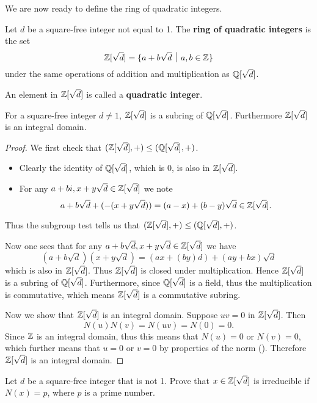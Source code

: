We are now ready to define the ring of quadratic integers.
\begin{definition}
    Let $d$ be a square-free integer not equal to 1. The \textbf{ring of quadratic integers} is the set
    \[
        \Z[\sqrt{d}] = \{a + b\sqrt{d} \vert a,b\in\Z\}
    \]
    under the same operations of addition and multiplication as $\mathbb{Q}[\sqrt{d}]$.

    An element in $\mathbb{Z}[\sqrt{d}]$ is called a \textbf{quadratic integer}.
\end{definition}
\begin{proposition}
    For a square-free integer $d \neq 1$, $\mathbb{Z}[\sqrt{d}]$ is a subring of $\mathbb{Q}[\sqrt{d}]$. Furthermore $\mathbb{Z}[\sqrt{d}]$ is an integral domain.
\end{proposition}
\begin{proof}
    We first check that $(\mathbb{Z}[\sqrt{d}], +) \leq (\mathbb{Q}[\sqrt{d}], +)$.
    \begin{itemize}
        \item Clearly the identity of $\mathbb{Q}[\sqrt{d}]$, which is 0, is also in $\mathbb{Z}[\sqrt{d}]$.
        \item For any $a+bi, x+y\sqrt{d} \in \mathbb{Z}[\sqrt{d}]$ we note
        \[
            a + b\sqrt{d} + (-(x+y\sqrt{d})) = (a-x) + (b-y)\sqrt{d} \in \mathbb{Z}[\sqrt{d}].
        \]
    \end{itemize}
    Thus the subgroup test tells us that $(\mathbb{Z}[\sqrt{d}], +) \leq (\mathbb{Q}[\sqrt{d}], +)$.

    Now one sees that for any $a+b\sqrt{d}, x+y\sqrt{d} \in \mathbb{Z}[\sqrt{d}]$ we have
    \[
        (a+b\sqrt{d})(x+y\sqrt{d}) = (ax+(by)d) + (ay+bx)\sqrt{d}
    \]
    which is also in $\mathbb{Z}[\sqrt{d}]$. Thus $\mathbb{Z}[\sqrt{d}]$ is closed under multiplication. Hence $\mathbb{Z}[\sqrt{d}]$ is a subring of $\mathbb{Q}[\sqrt{d}]$. Furthermore, since $\mathbb{Q}[\sqrt{d}]$ is a field, thus the multiplication is commutative, which means $\mathbb{Z}[\sqrt{d}]$ is a commutative subring.

    Now we show that $\mathbb{Z}[\sqrt{d}]$ is an integral domain. Suppose $uv = 0$ in $\mathbb{Z}[\sqrt{d}]$. Then
    \[
        N(u)N(v) = N(uv) = N(0) = 0.
    \]
    Since $\mathbb{Z}$ is an integral domain, thus this means that $N(u) = 0$ or $N(v) = 0$, which further means that $u = 0$ or $v = 0$ by properties of the norm (). Therefore $\mathbb{Z}[\sqrt{d}]$ is an integral domain.
\end{proof}

\begin{exercise}\label{exercise-quadratic-integer-irreducible-if-norm-is-prime}
    Let $d$ be a square-free integer that is not 1. Prove that $x \in \mathbb{Z}[\sqrt{d}]$ is irreducible if $N(x) = p$, where $p$ is a prime number.
\end{exercise}


